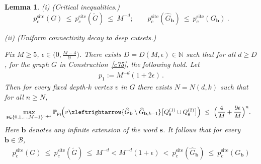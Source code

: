 \documentclass[11pt]{amsart}
\theoremstyle{plain}
\newtheorem{lemma}[theorem]{Lemma}
\numberwithin{equation}{section}
\numberwithin{figure}{section}
\newcommand\PP{{\mathbb P}}
\begin{document}
\begin{lemma}\label{le85}
\noindent
(i) (\emph{Critical inequalities.}) 
\[
p_c^{\mathrm{site}}(G)\ \le\ p_c^{\mathrm{site}}(\widetilde G)\ \le\ M^{-d};\qquad p_c^{\mathrm{site}}(\widehat G_{\mathbf b})
\ \le\ p_c^{\mathrm{site}}(G_{\mathbf b})
\ .
\]

\smallskip
\noindent
(ii) (\emph{Uniform connectivity decay to deep cutsets.})

Fix $M\geq 5$, $\epsilon\in\bigl(0,\tfrac{M-4}{9}\bigr)$. There exists $D=D(M,\epsilon)\in\mathbb N$ such that for all $d\geq D$,
for the graph $G$ in Construction~\ref{c75}, the following hold.
Let
\begin{align}
p_1:=M^{-d}(1+2\epsilon)\,.\label{dp1}
\end{align}
Then for every fixed depth-$k$ vertex $v$ in $G$ there exists $N=N(d,k)$ such that for all $n\ge N$,
\begin{align}\label{ps2}
&\max_{\mathbf s\in\{0,1,\ldots,M-1\}^{n+k}}
\PP_{p_1}\!\Bigl(
v\xleftrightarrow{\widehat G_{\mathbf b}\setminus \widehat G_{\mathbf b,k-1}}
\bigl[Q_{\mathbf s}^{(1)}\cup Q_{\mathbf s}^{(2)}\bigr]
\Bigr)
\ \le\ \Bigl(\frac{4}{M}+\frac{9\epsilon}{M}\Bigr)^n.
\end{align}
Here $\mathbf b$ denotes any infinite extension of the word $\mathbf s$. It follows that for every $\mathbf b\in\mathcal B$,
\begin{align*}
p_c^{\mathrm{site}}(G)\ \le\ p_c^{\mathrm{site}}(\widetilde G)\ \le\ M^{-d}< M^{-d}(1+\epsilon)\ <\ p_c^{\mathrm{site}}(\widehat G_{\mathbf b})
\ \le\ p_c^{\mathrm{site}}(G_{\mathbf b})
\end{align*}
\end{lemma}
\end{document}
